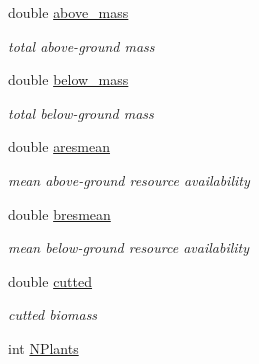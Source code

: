\begin{DoxyCompactItemize}
\mbox{\label{struct_s_grid_out_aa11ce7cc8d229b841630ee1bfe172bd0}} 
double \mbox{\hyperlink{struct_s_grid_out_aa11ce7cc8d229b841630ee1bfe172bd0}{above\+\_\+mass}}
\begin{DoxyCompactList}\small\item\em total above-\/ground mass \end{DoxyCompactList}\item 
\mbox{\label{struct_s_grid_out_a08b642ac619156b0f37bbbae69d28f26}} 
double \mbox{\hyperlink{struct_s_grid_out_a08b642ac619156b0f37bbbae69d28f26}{below\+\_\+mass}}
\begin{DoxyCompactList}\small\item\em total below-\/ground mass \end{DoxyCompactList}\item 
\mbox{\label{struct_s_grid_out_a70eaf5a7609508f4053f9b1a639317e8}} 
double \mbox{\hyperlink{struct_s_grid_out_a70eaf5a7609508f4053f9b1a639317e8}{aresmean}}
\begin{DoxyCompactList}\small\item\em mean above-\/ground resource availability \end{DoxyCompactList}\item 
\mbox{\label{struct_s_grid_out_ab6655ee65f795c4d97e809b10686da80}} 
double \mbox{\hyperlink{struct_s_grid_out_ab6655ee65f795c4d97e809b10686da80}{bresmean}}
\begin{DoxyCompactList}\small\item\em mean below-\/ground resource availability \end{DoxyCompactList}\item 
\mbox{\label{struct_s_grid_out_a0786d72ac1d3311a0d9e8f4bb158fb2c}} 
double \mbox{\hyperlink{struct_s_grid_out_a0786d72ac1d3311a0d9e8f4bb158fb2c}{cutted}}
\begin{DoxyCompactList}\small\item\em cutted biomass \end{DoxyCompactList}\item 
\mbox{\label{struct_s_grid_out_a6ab518e70b680c7ba1d09b4315ce48f1}} 
int \mbox{\hyperlink{struct_s_grid_out_a6ab518e70b680c7ba1d09b4315ce48f1}{N\+Plants}}

\end{DoxyCompactItemize}
